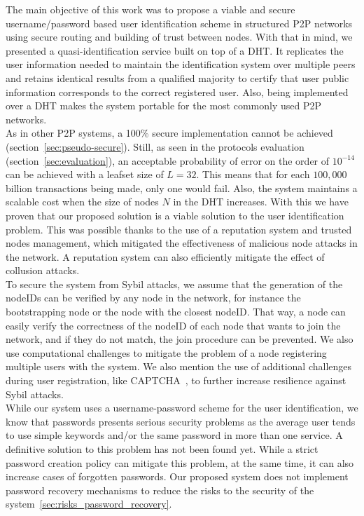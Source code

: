 The main objective of this work was to propose a viable and secure
username/password based user identification scheme in structured P2P
networks using secure routing and building of trust between nodes.
With that in mind, we presented a quasi-identification service built on top of a DHT. It
replicates the user information needed to maintain the identification system
over multiple peers and retains identical results from a qualified majority to
certify that user public information corresponds to the correct registered
user. Also, being implemented over a DHT makes the system portable for the most
commonly used P2P networks.\\
As in other P2P systems, a 100\% secure implementation cannot be achieved
(section~\ref{sec:pseudo-secure}). Still, as seen in the
protocols evaluation (section~\ref{sec:evaluation}), an acceptable probability of error on the order
of $10^{-14}$ can be achieved with a leafset size of $L = 32$. This means that
for each $100,000$ billion transactions being made, only one would fail. Also, the system
maintains a scalable cost when the size of nodes $N$ in the DHT increases.
With this we have proven that our proposed solution is a viable solution to the user
identification problem.
This was possible thanks to the use of a reputation system and trusted
nodes management, which mitigated the effectiveness of malicious node attacks in
the network. A reputation system can also efficiently mitigate the effect of
collusion attacks.\\
To secure the system from Sybil attacks, we assume that the generation of the nodeIDs can
be verified by any node in the network, for instance the bootstrapping node or
the node with the closest nodeID. That way, a node can easily verify the correctness of the nodeID
of each node that wants to join the network, and if they do not match, the join procedure can be prevented.
We also use computational challenges to mitigate the problem of a
node registering multiple users with the system. We also mention the use of
additional challenges during user registration, like
CAPTCHA~\cite{von2003captcha}, to further increase resilience against Sybil
attacks.\\
While our system uses a username-password scheme for the user identification,
we know that passwords presents serious security problems as the average user tends
to use simple keywords and/or the same password in more than one service.
A definitive solution to this problem has not
been found yet. While a strict password creation policy can mitigate this
problem, at the same time, it can also increase cases of forgotten passwords.
Our proposed system does not implement password recovery mechanisms to reduce the
risks to the security of the system~\ref{sec:risks_password_recovery}.


